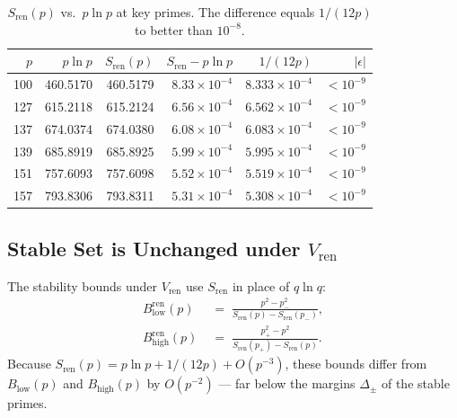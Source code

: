 \documentclass[12pt,a4paper]{article}
\theoremstyle{definition}
\theoremstyle{remark}
\begin{document}
\begin{table}[h]
\centering
\caption{$S_{\mathrm{ren}}(p)$ vs.\ $p\ln p$ at key primes.
         The difference equals $1/(12p)$ to better than $10^{-8}$.}
\label{tab:pss:stirling}
\begin{tabular}{rrrrrr}
\toprule
$p$ & $p\ln p$ & $S_{\mathrm{ren}}(p)$ & $S_{\mathrm{ren}}-p\ln p$ & $1/(12p)$ & $|\epsilon|$ \\
\midrule
 100 &  460.5170 &  460.5179 & $8.33\times10^{-4}$ & $8.333\times10^{-4}$ & $< 10^{-9}$ \\
 127 &  615.2118 &  615.2124 & $6.56\times10^{-4}$ & $6.562\times10^{-4}$ & $< 10^{-9}$ \\
 137 &  674.0374 &  674.0380 & $6.08\times10^{-4}$ & $6.083\times10^{-4}$ & $< 10^{-9}$ \\
 139 &  685.8919 &  685.8925 & $5.99\times10^{-4}$ & $5.995\times10^{-4}$ & $< 10^{-9}$ \\
 151 &  757.6093 &  757.6098 & $5.52\times10^{-4}$ & $5.519\times10^{-4}$ & $< 10^{-9}$ \\
 157 &  793.8306 &  793.8311 & $5.31\times10^{-4}$ & $5.308\times10^{-4}$ & $< 10^{-9}$ \\
\bottomrule
\end{tabular}
\end{table}

\subsection{Stable Set is Unchanged under $V_{\mathrm{ren}}$}
\label{sec:pss:gamma:stable}

The stability bounds under $V_{\mathrm{ren}}$ use $S_{\mathrm{ren}}$ in place of
$q\ln q$:
\begin{align}
  B^{\mathrm{ren}}_{\mathrm{low}}(p)  &\;=\;
    \frac{p^2 - p_-^2}{S_{\mathrm{ren}}(p) - S_{\mathrm{ren}}(p_-)},
  \label{eq:pss:BlowGamma} \\
  B^{\mathrm{ren}}_{\mathrm{high}}(p) &\;=\;
    \frac{p_+^2 - p^2}{S_{\mathrm{ren}}(p_+) - S_{\mathrm{ren}}(p)}.
  \label{eq:pss:BhighGamma}
\end{align}
Because $S_{\mathrm{ren}}(p) = p\ln p + 1/(12p) + O(p^{-3})$, these bounds
differ from $B_{\mathrm{low}}(p)$ and $B_{\mathrm{high}}(p)$ by $O(p^{-2})$
— far below the margins $\Delta_\pm$ of the stable primes.
\end{document}

